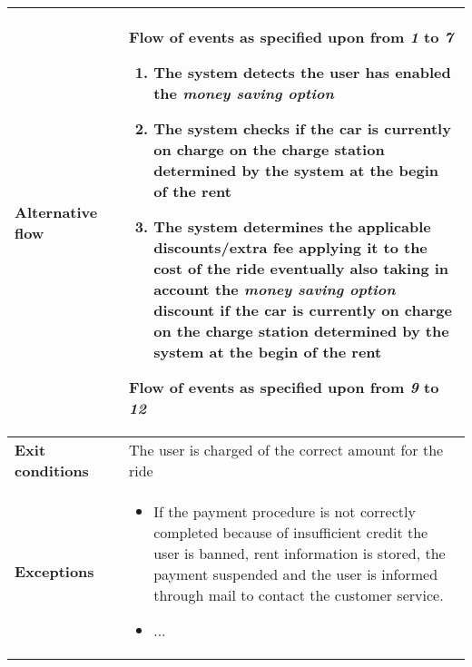 \begin{tabular}{p{0.25\linewidth}p{0.75\linewidth}}
\midrule
\textbf{Alternative flow} & 
Flow of events as specified upon from \emph{1} to \emph{7}
\begin{enumerate}[label=8 \alph*.]
	\item The system detects the user has enabled the \emph{money saving option}
	\item The system checks if the car is currently on charge on the charge station determined by the system at the begin of the rent
	\item The system determines the applicable discounts/extra fee applying it to the cost of the ride eventually also taking in account the \emph{money saving option} discount if the car is currently on charge on the charge station determined by the system at the begin of the rent
\end{enumerate}
Flow of events as specified upon from \emph{9} to \emph{12} \\
\midrule
\textbf{Exit conditions} & 
The user is charged of the correct amount for the ride\\
\midrule
\textbf{Exceptions} & 
\begin{itemize}
	\item If the payment procedure is not correctly completed because of insufficient credit the user is banned, rent information is stored, the payment suspended and the user is informed through mail to contact the customer service.  
	\item ...
\end{itemize} \\
\bottomrule
\end{tabular}

